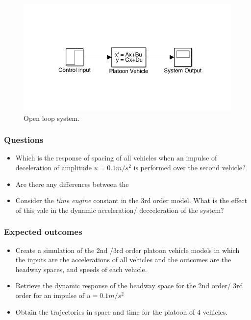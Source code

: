 \documentclass[]{book}
\providecommand{\tightlist}{%
  \setlength{\itemsep}{0pt}\setlength{\parskip}{0pt}}
\theoremstyle{definition}
\theoremstyle{definition}
\theoremstyle{definition}
\theoremstyle{remark}
\begin{document}
\begin{figure}

{\centering \includegraphics{images/p2-02-control-open} 

}

\caption{Open loop system.}\label{fig:opencav}
\end{figure}

\hypertarget{questions-5}{%
\subsubsection*{Questions}\label{questions-5}}

\begin{itemize}
\tightlist
\item
  Which is the response of spacing of all vehicles when an impulse of
  deceleration of amplitude \(u = 0.1m/s^2\) is performed over the
  second vehicle?
\item
  Are there any differences between the
\item
  Consider the \emph{time engine} constant in the 3rd order model. What
  is the effect of this vale in the dynamic acceleration/ decceleration
  of the system?
\end{itemize}

\hypertarget{expected-outcomes-5}{%
\subsubsection*{Expected outcomes}\label{expected-outcomes-5}}

\begin{itemize}
\tightlist
\item
  Create a simulation of the 2nd /3rd order platoon vehicle models in
  which the inputs are the accelerations of all vehicles and the
  outcomes are the headway spaces, and speeds of each vehicle.
\item
  Retrieve the dynamic response of the headway space for the 2nd order/
  3rd order for an impulse of \(u = 0.1m/s^2\)
\item
  Obtain the trajectories in space and time for the platoon of 4
  vehicles.
\end{itemize}
\end{document}
